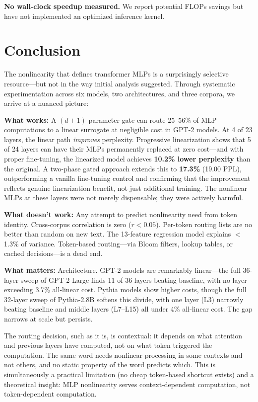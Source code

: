 \documentclass[11pt]{article}
\begin{document}
\textbf{No wall-clock speedup measured.} We report potential FLOPs savings but have not implemented an optimized inference kernel.

\section{Conclusion}

The nonlinearity that defines transformer MLPs is a surprisingly selective resource---but not in the way initial analysis suggested. Through systematic experimentation across six models, two architectures, and three corpora, we arrive at a nuanced picture:

\textbf{What works:} A $(d{+}1)$-parameter gate can route 25--56\% of MLP computations to a linear surrogate at negligible cost in GPT-2 models. At 4 of 23 layers, the linear path \textit{improves} perplexity. Progressive linearization shows that 5 of 24 layers can have their MLPs permanently replaced at zero cost---and with proper fine-tuning, the linearized model achieves \textbf{10.2\% lower perplexity} than the original. A two-phase gated approach extends this to \textbf{17.3\%} (19.00 PPL), outperforming a vanilla fine-tuning control and confirming that the improvement reflects genuine linearization benefit, not just additional training. The nonlinear MLPs at these layers were not merely dispensable; they were actively harmful.

\textbf{What doesn't work:} Any attempt to predict nonlinearity need from token identity. Cross-corpus correlation is zero ($r < 0.05$). Per-token routing lists are no better than random on new text. The 13-feature regression model explains $<$1.3\% of variance. Token-based routing---via Bloom filters, lookup tables, or cached decisions---is a dead end.

\textbf{What matters:} Architecture. GPT-2 models are remarkably linear---the full 36-layer sweep of GPT-2 Large finds 11 of 36 layers beating baseline, with no layer exceeding 3.7\% all-linear cost. Pythia models show higher costs, though the full 32-layer sweep of Pythia-2.8B softens this divide, with one layer (L3) narrowly beating baseline and middle layers (L7--L15) all under 4\% all-linear cost. The gap narrows at scale but persists.

The routing decision, such as it is, is contextual: it depends on what attention and previous layers have computed, not on what token triggered the computation. The same word needs nonlinear processing in some contexts and not others, and no static property of the word predicts which. This is simultaneously a practical limitation (no cheap token-based shortcut exists) and a theoretical insight: MLP nonlinearity serves context-dependent computation, not token-dependent computation.
\end{document}
